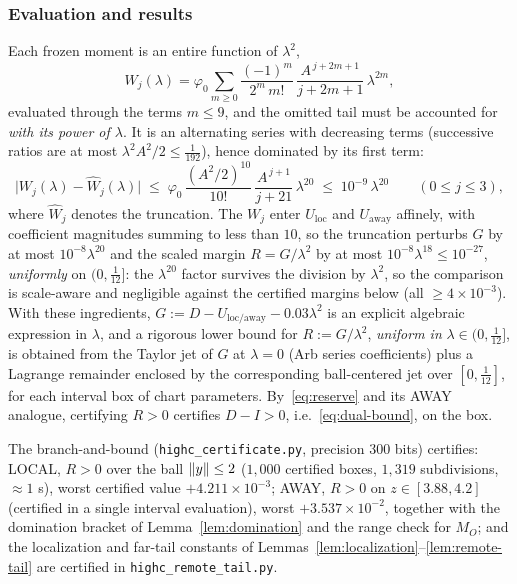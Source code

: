 \subsubsection*{Evaluation and results}

Each frozen moment is an entire function of $\lambda^2$,
\[
        W_j(\lambda)=\varphi_0\sum_{m\ge0}\frac{(-1)^m}{2^m\,m!}\,\frac{A^{\,j+2m+1}}{j+2m+1}\,\lambda^{2m},
\]
evaluated through the terms $m\le9$, and the omitted tail must be accounted for \emph{with its power of $\lambda$}. It is an alternating series with decreasing terms (successive ratios are at most $\lambda^2A^2/2\le\tfrac1{192}$), hence dominated by its first term:
\[
        \bigl|W_j(\lambda)-\widehat W_j(\lambda)\bigr|
        \;\le\;\varphi_0\,\frac{(A^2/2)^{10}}{10!}\,\frac{A^{\,j+1}}{j+21}\,\lambda^{20}
        \;\le\;10^{-9}\,\lambda^{20}
        \qquad(0\le j\le3),
\]
where $\widehat W_j$ denotes the truncation. The $W_j$ enter $U_{\mathrm{loc}}$ and $U_{\mathrm{away}}$ affinely, with coefficient magnitudes summing to less than $10$, so the truncation perturbs $G$ by at most $10^{-8}\lambda^{20}$ and the scaled margin $R=G/\lambda^2$ by at most $10^{-8}\lambda^{18}\le10^{-27}$, \emph{uniformly} on $(0,\tfrac1{12}]$: the $\lambda^{20}$ factor survives the division by $\lambda^2$, so the comparison is scale-aware and negligible against the certified margins below (all $\ge4\times10^{-3}$). With these ingredients, $G:=D-U_{\mathrm{loc/away}}-0.03\lambda^2$ is an explicit algebraic expression in $\lambda$, and a rigorous lower bound for $R:=G/\lambda^2$, \emph{uniform in} $\lambda\in(0,\tfrac1{12}]$, is obtained from the Taylor jet of $G$ at $\lambda=0$ (Arb series coefficients) plus a Lagrange remainder enclosed by the corresponding ball-centered jet over $[0,\tfrac1{12}]$, for each interval box of chart parameters. By~\eqref{eq:reserve} and its AWAY analogue, certifying $R>0$ certifies $D-I>0$, i.e.~\eqref{eq:dual-bound}, on the box.

The branch-and-bound (\texttt{highc\_certificate.py}, precision $300$ bits) certifies: LOCAL, $R>0$ over the ball $\lVert y\rVert\le2$ ($1{,}000$ certified boxes, $1{,}319$ subdivisions, $\approx1$ s), worst certified value $+4.211\times10^{-3}$; AWAY, $R>0$ on $z\in[3.88,4.2]$ (certified in a single interval evaluation), worst $+3.537\times10^{-2}$, together with the domination bracket of Lemma~\ref{lem:domination} and the range check for $M_O$; and the localization and far-tail constants of Lemmas~\ref{lem:localization}--\ref{lem:remote-tail} are certified in \texttt{highc\_remote\_tail.py}.

